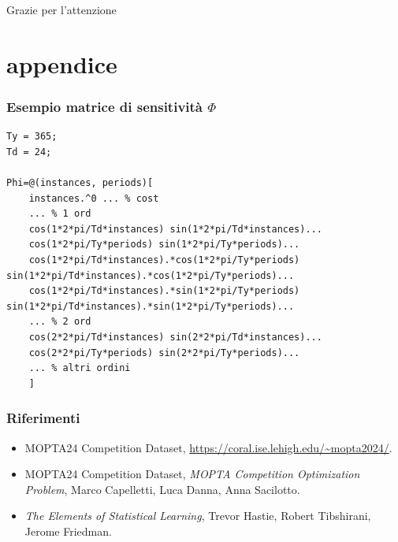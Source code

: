 \documentclass{beamer}
\begin{document}
\begin{frame}
\begin{overlayarea}{\textwidth}{\textheight}
    \end{overlayarea}
\end{frame}

\begin{frame}
\Huge{\centerline{Grazie per l'attenzione}}
\end{frame}


\appendix
\setcounter{page}{1}
\renewcommand{\thepage}{A\arabic{page}}


\section{appendice}

\begin{frame}[fragile]
    \frametitle{Esempio matrice di sensitività $\Phi$}
\small 
\begin{lstlisting}
Ty = 365;
Td = 24;

Phi=@(instances, periods)[
    instances.^0 ... % cost
    ... % 1 ord
    cos(1*2*pi/Td*instances) sin(1*2*pi/Td*instances)...
    cos(1*2*pi/Ty*periods) sin(1*2*pi/Ty*periods)...
    cos(1*2*pi/Td*instances).*cos(1*2*pi/Ty*periods) sin(1*2*pi/Td*instances).*cos(1*2*pi/Ty*periods)...
    cos(1*2*pi/Td*instances).*sin(1*2*pi/Ty*periods) sin(1*2*pi/Td*instances).*sin(1*2*pi/Ty*periods)...
    ... % 2 ord
    cos(2*2*pi/Td*instances) sin(2*2*pi/Td*instances)... 
    cos(2*2*pi/Ty*periods) sin(2*2*pi/Ty*periods)...
    ... % altri ordini
    ]
\end{lstlisting}
    
\end{frame}

\begin{frame}
    \frametitle{Riferimenti}

    \begin{itemize}
        \item MOPTA24 Competition Dataset, \url{https://coral.ise.lehigh.edu/~mopta2024/}.
        \vspace{0.3cm}
        \item MOPTA24 Competition Dataset, \textit{MOPTA Competition Optimization Problem}, Marco Capelletti, Luca Danna, Anna Sacilotto.
        \vspace{0.3cm}
        \item \textit{The Elements of
Statistical Learning}, Trevor Hastie, Robert Tibshirani, Jerome Friedman.
    \end{itemize}
\end{frame}
\end{document}
